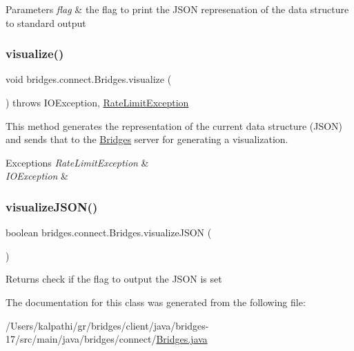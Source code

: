 \begin{DoxyParams}{Parameters}
{\em flag} & the flag to print the J\+S\+ON represenation of the data structure to standard output \\
\hline
\end{DoxyParams}
\mbox{\label{classbridges_1_1connect_1_1_bridges_a1853d64ffb8675ba2ec227a2b819cd24}} 
\subsubsection{\texorpdfstring{visualize()}{visualize()}}
{\footnotesize\ttfamily void bridges.\+connect.\+Bridges.\+visualize (\begin{DoxyParamCaption}{ }\end{DoxyParamCaption}) throws I\+O\+Exception, \mbox{\hyperlink{classbridges_1_1validation_1_1_rate_limit_exception}{Rate\+Limit\+Exception}}}

This method generates the representation of the current data structure (J\+S\+ON) and sends that to the \mbox{\hyperlink{classbridges_1_1connect_1_1_bridges}{Bridges}} server for generating a visualization.


\begin{DoxyExceptions}{Exceptions}
{\em Rate\+Limit\+Exception} & \\
\hline
{\em I\+O\+Exception} & \\
\hline
\end{DoxyExceptions}
\mbox{\label{classbridges_1_1connect_1_1_bridges_afd3c63780396e92c94c923037385b31d}} 
\subsubsection{\texorpdfstring{visualize\+J\+S\+O\+N()}{visualizeJSON()}}
{\footnotesize\ttfamily boolean bridges.\+connect.\+Bridges.\+visualize\+J\+S\+ON (\begin{DoxyParamCaption}{ }\end{DoxyParamCaption})}

\begin{DoxyReturn}{Returns}
check if the flag to output the J\+S\+ON is set 
\end{DoxyReturn}


The documentation for this class was generated from the following file\+:\begin{DoxyCompactItemize}
\item 
/\+Users/kalpathi/gr/bridges/client/java/bridges-\/17/src/main/java/bridges/connect/\mbox{\hyperlink{_bridges_8java}{Bridges.\+java}}\end{DoxyCompactItemize}
